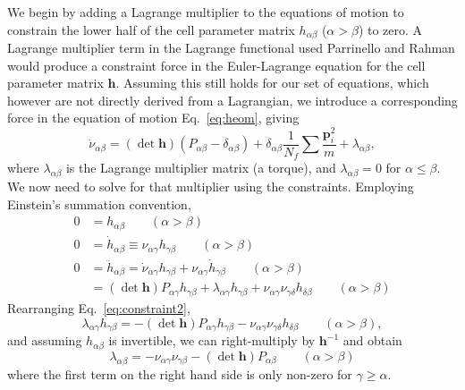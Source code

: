 \documentclass[12pt,letter]{article}
\renewcommand{\vec}[1]{\mathbf{#1}}
\begin{document}
We begin by adding a Lagrange multiplier to the equations of motion to constrain the lower half of the cell parameter matrix
$h_{\alpha\beta}$ ($\alpha > \beta$) to zero. A Lagrange multiplier term in the Lagrange functional
used Parrinello and Rahman \cite{Parrinello1981} would produce a constraint force in the
Euler-Lagrange equation for the cell parameter matrix $\vec h$. Assuming this still holds for our set of equations, which however are not directly derived from a Lagrangian, we introduce a corresponding
force in the equation of motion Eq.~\eqref{eq:heom}, giving
\begin{equation}
\dot{\nu}_{\alpha\beta} = (\det \vec h) (P_{\alpha\beta} - \delta_{\alpha\beta}) + \delta_{\alpha\beta} \frac{1}{N_f} \sum \frac{\vec p_i^2}{m} + \lambda_{\alpha\beta}\label{eq:heom_lagrange},
\end{equation}
where $\lambda_{\alpha\beta}$ is the Lagrange multiplier matrix (a torque), and $\lambda_{\alpha\beta} = 0$ for $\alpha \le \beta$. We now need to solve for that multiplier using the constraints. Employing Einstein's
summation convention,
\begin{align}
0 &= h_{\alpha \beta}\qquad(\alpha > \beta)\\
0 &= \dot{h}_{\alpha\beta} \equiv \nu_{\alpha \gamma} h_{\gamma \beta}\qquad(\alpha> \beta)\\
0 &= \ddot{h}_{\alpha\beta}=\dot{\nu}_{\alpha\gamma} h_{\gamma\beta}
+\nu_{\alpha\gamma}\dot{h}_{\gamma\beta}\qquad(\alpha>\beta)\nonumber\\
&=(\det \vec h) P_{\alpha\gamma} h_{\gamma\beta}+ \lambda_{\alpha\gamma}h_{\gamma\beta}+\nu_{\alpha\gamma}\nu_{\gamma\delta} h_{\delta\beta} \qquad(\alpha>\beta)\label{eq:constraint2}
\end{align}
Rearranging Eq.~\eqref{eq:constraint2},
\begin{equation}
\lambda_{\alpha\gamma}h_{\gamma\beta} =-(\det \vec h) P_{\alpha\gamma} h_{\gamma\beta}-\nu_{\alpha\gamma}\nu_{\gamma\delta} h_{\delta\beta}\qquad(\alpha>\beta),
\end{equation}
and assuming $h_{\alpha\beta}$ is invertible, we can right-multiply by $\vec h^{-1}$ and obtain
\begin{equation}
\lambda_{\alpha\beta} = - \nu_{\alpha\gamma}\nu_{\gamma\beta} - (\det\vec h) P_{\alpha\beta} \qquad(\alpha > \beta)
\end{equation}
where the first term on the right hand side is only non-zero for $\gamma \ge \alpha$.
\end{document}
